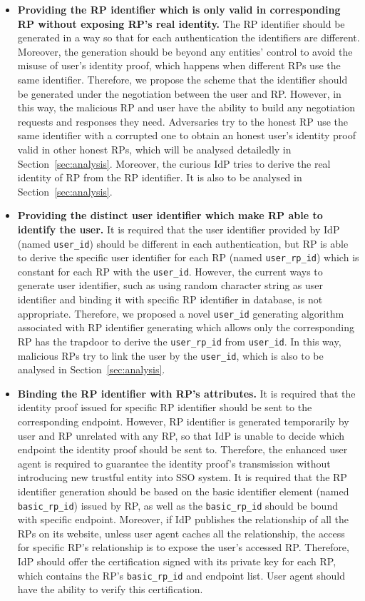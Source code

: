 \begin{itemize}
\item \textbf{Providing the RP identifier which is only valid in corresponding RP without exposing RP's real identity.} The RP identifier should be generated in a way so that for each authentication the identifiers are different. Moreover, the generation should be beyond any entities' control to avoid the misuse of user's identity proof, which happens when different RPs use the same identifier. Therefore, we propose the scheme that the identifier should be generated under the negotiation between the user and RP. However, in this way, the malicious RP and user have the ability to build any negotiation requests and responses they need. Adversaries try to the honest RP use the same identifier with a corrupted one to obtain an honest user's identity proof valid in other honest RPs, which will be analysed detailedly in Section~\ref{sec:analysis}. Moreover, the curious IdP tries to derive the real identity of RP from the RP identifier. It is also to be analysed in Section~\ref{sec:analysis}.
\item \textbf{Providing the distinct user identifier which make RP able to identify the user. } It is required that the user identifier provided by IdP (named \verb+user_id+) should be different in each authentication, but RP is able to derive the specific user identifier for each RP (named \verb+user_rp_id+) which is constant for each RP with the \verb+user_id+. However, the current ways to generate user identifier, such as using random character string as user identifier and binding it with specific RP identifier in database, is not appropriate. Therefore, we proposed a novel \verb+user_id+ generating algorithm associated with RP identifier generating which allows only the corresponding RP has the trapdoor to derive the \verb+user_rp_id+ from \verb+user_id+. In this way, malicious RPs try to link the user by the \verb+user_id+, which is also to be analysed in Section~\ref{sec:analysis}.
\item \textbf{Binding the RP identifier with RP's attributes. } It is required that the identity proof issued for specific RP identifier should be sent to the corresponding endpoint. However, RP identifier is generated temporarily by user and RP unrelated with any RP, so that IdP is unable to decide which endpoint the identity proof should be sent to. Therefore, the enhanced user agent is required to guarantee the identity proof's transmission without introducing new trustful entity into SSO system. It is required that the RP identifier generation should be based on the basic identifier element (named \verb+basic_rp_id+) issued by RP, as well as the \verb+basic_rp_id+ should be bound with specific endpoint. Moreover, if IdP publishes the relationship of all the RPs on its website, unless user agent caches all the relationship, the access for specific RP's relationship is to expose the user's accessed RP. Therefore, IdP should offer the certification signed with its private key for each RP, which contains the RP's \verb+basic_rp_id+ and endpoint list. User agent should have the ability to verify this certification.

\end{itemize}
